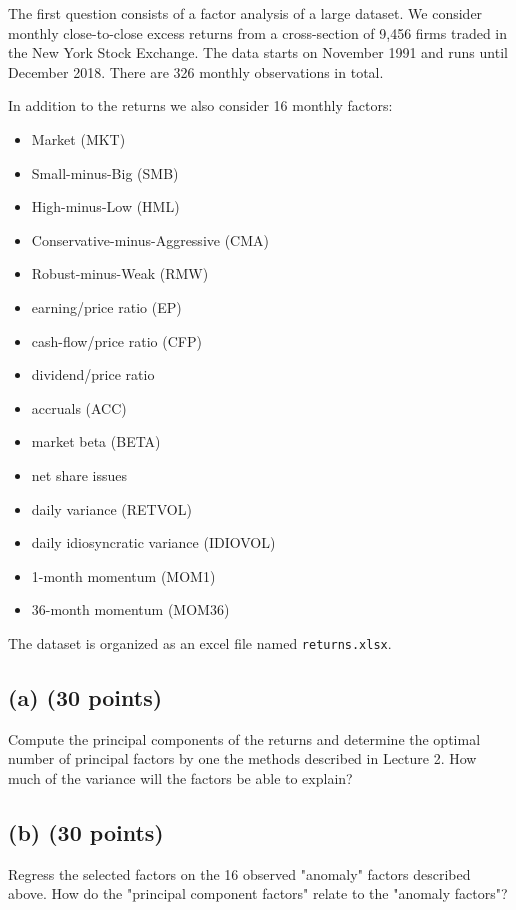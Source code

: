 The first question consists of a factor analysis of a large dataset. We consider monthly close-to-close excess returns from a cross-section of 9,456 firms traded in the New York Stock Exchange.
The data starts on November 1991 and runs until December 2018. There are 326 monthly
observations in total. 

In addition to the returns we also consider 16 monthly factors:
 
\begin{itemize}
	\item Market (MKT)
	\item Small-minus-Big (SMB)
	\item High-minus-Low (HML)
	\item Conservative-minus-Aggressive (CMA)
	\item Robust-minus-Weak (RMW)
	\item earning/price ratio (EP)
	\item cash-flow/price ratio (CFP)
	\item dividend/price ratio
	\item accruals (ACC)
	\item market beta (BETA)
	\item net share issues 
	\item daily variance (RETVOL)
	\item daily idiosyncratic variance (IDIOVOL)
	\item 1-month momentum (MOM1)
	\item 36-month momentum (MOM36)
\end{itemize}

The dataset is organized as an excel file named \texttt{returns.xlsx}.


\subsection{(a) (30 points)}
Compute the principal components of the returns and determine the optimal number of principal factors by one the methods described in Lecture 2. How much of the variance will the factors be able to explain?





\subsection{(b) (30 points)}
Regress the selected factors on the 16 observed "anomaly" factors described above. How do the "principal component factors" relate to the "anomaly factors"?




